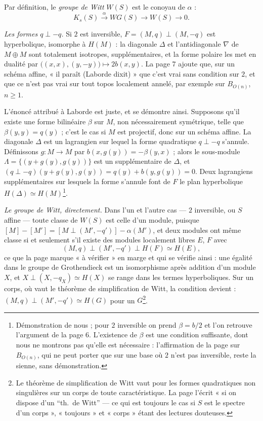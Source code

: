 \documentclass[11pt,a4paper]{article}
\begin{document}
Par définition, le \emph{groupe de Witt} $W(S)$ est le conoyau de $\alpha$ :
\[
K_s(S) \xrightarrow{\ \alpha\ } WG(S) \longrightarrow W(S) \longrightarrow 0 .
\]

\emph{Les formes $q \perp -q$.} Si $2$ est inversible, $F = (M, q) \perp
(M, -q)$ est hyperbolique, isomorphe à $H(M)$ : la diagonale $\Delta$ et
l'antidiagonale $\nabla$ de $M \oplus M$ sont totalement isotropes,
supplémentaires, et la forme polaire les met en dualité par
$\bigl((x, x), (y, -y)\bigr) \mapsto 2b(x, y)$. La page 7 ajoute que, sur un
schéma affine, « il paraît (Laborde dixit) » que c'est vrai sans condition
sur $2$, et que ce n'est pas vrai sur tout topos localement annelé, par
exemple sur $B_{O(n)}$, $n \geqslant 1$.

L'énoncé attribué à Laborde est juste, et se démontre ainsi. Supposons
qu'il existe une forme bilinéaire $\beta$ sur $M$, non nécessairement
symétrique, telle que $\beta(y, y) = q(y)$ ; c'est le cas si $M$ est
projectif, donc sur un schéma affine. La diagonale $\Delta$ est un
lagrangien sur lequel la forme quadratique $q \perp -q$ s'annule. Définissons
$g \colon M \to M$ par $b(x, g(y)) = -\beta(y, x)$ ; alors le sous-module
$\Lambda = \{(y + g(y), g(y))\}$ est un supplémentaire de $\Delta$, et
$(q \perp -q)(y + g(y), g(y)) = q(y) + b(y, g(y)) = 0$. Deux lagrangiens
supplémentaires sur lesquels la forme s'annule font de $F$ le plan
hyperbolique $H(\Delta) \simeq H(M)$\footnote{Démonstration de nous ; pour
$2$ inversible on prend $\beta = b/2$ et l'on retrouve l'argument de la page
6. L'existence de $\beta$ est une condition suffisante, dont nous ne
montrons pas qu'elle est nécessaire : l'affirmation de la page sur
$B_{O(n)}$, qui ne peut porter que sur une base où $2$ n'est pas inversible,
reste la sienne, sans démonstration.}.

\emph{Le groupe de Witt, directement.} Dans l'un et l'autre cas —
$2$ inversible, ou $S$ affine — toute classe de $W(S)$ est celle d'un module,
puisque $[M] - [M'] = [M \perp (M', -q')] - \alpha(M')$, et deux modules ont
même classe si et seulement s'il existe des modules localement libres $E$,
$F$ avec
\[
(M, q) \perp (M', -q') \perp H(F) \simeq H(E),
\]
ce que la page marque « à vérifier » en marge et qui se vérifie ainsi : une
égalité dans le groupe de Grothendieck est un isomorphisme après addition
d'un module $X$, et $X \perp (X, -q_X) \simeq H(X)$ se range dans les
termes hyperboliques. Sur un corps, où vaut le théorème de simplification
de Witt, la condition devient : $(M, q) \perp (M', -q') \simeq H(G)$ pour un
$G$\footnote{Le théorème de simplification de Witt vaut pour les formes
quadratiques non singulières sur un corps de toute caractéristique. La page
l'écrit « si on dispose d'un “th.\ de Witt” — ce qui est toujours le cas si
$S$ est le spectre d'un corps », « toujours » et « corps » étant des
lectures douteuses.}.
\end{document}
